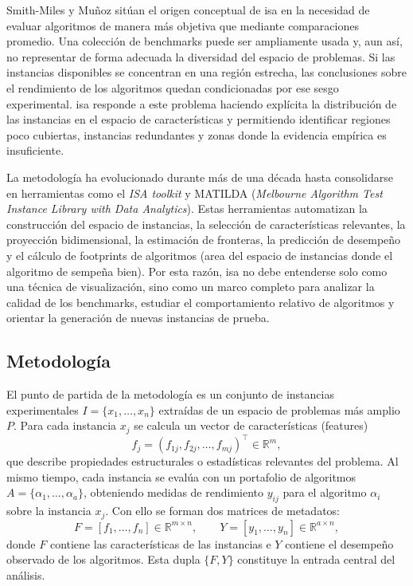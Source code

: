 Smith-Miles y Muñoz sitúan el origen conceptual de \acrshort{isa} en la necesidad de evaluar
algoritmos de manera más objetiva que mediante comparaciones promedio. Una colección de
benchmarks puede ser ampliamente usada y, aun así, no representar de forma adecuada la
diversidad del espacio de problemas. Si las instancias disponibles se concentran en una región
estrecha, las conclusiones sobre el rendimiento de los algoritmos quedan condicionadas por ese
sesgo experimental. \acrshort{isa} responde a este problema haciendo explícita la distribución de
las instancias en el espacio de características y permitiendo identificar regiones poco cubiertas,
instancias redundantes y zonas donde la evidencia empírica es insuficiente.

La metodología ha evolucionado durante más de una década hasta consolidarse en herramientas
como el \textit{ISA toolkit} y MATILDA (\textit{Melbourne Algorithm Test Instance Library with Data
Analytics}). Estas herramientas automatizan la construcción del espacio de instancias, la
selección de características relevantes, la proyección bidimensional, la estimación de fronteras,
la predicción de desempeño y el cálculo de footprints de algoritmos (area del espacio de instancias 
donde el algoritmo de sempeña bien). Por esta razón,
\acrshort{isa} no debe entenderse solo como una técnica de visualización, sino como un marco
completo para analizar la calidad de los benchmarks, estudiar el comportamiento relativo de
algoritmos y orientar la generación de nuevas instancias de prueba.

\newpage
\subsection{Metodología}
\label{subsec:isa_metodologia}

El punto de partida de la metodología es un conjunto de instancias experimentales
$I=\{x_1,\ldots,x_n\}$ extraídas de un espacio de problemas más amplio $P$. Para cada instancia
$x_j$ se calcula un vector de características (features)
\[
    f_j = (f_{1j}, f_{2j}, \ldots, f_{mj})^\top \in \mathbb{R}^m,
\]
que describe propiedades estructurales o estadísticas relevantes del problema. Al mismo tiempo,
cada instancia se evalúa con un portafolio de algoritmos
$A=\{\alpha_1,\ldots,\alpha_a\}$, obteniendo medidas de rendimiento
$y_{ij}$ para el algoritmo $\alpha_i$ sobre la instancia $x_j$. Con ello se forman dos matrices de
metadatos:
\[
    F = [f_1,\ldots,f_n]\in\mathbb{R}^{m\times n},
    \qquad
    Y = [y_1,\ldots,y_n]\in\mathbb{R}^{a\times n},
\]
donde $F$ contiene las características de las instancias e $Y$ contiene el desempeño observado
de los algoritmos. Esta dupla $\{F,Y\}$ constituye la entrada central del análisis.

